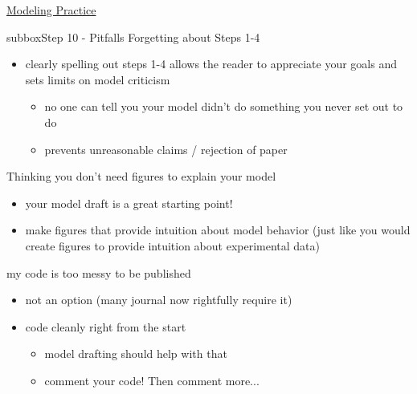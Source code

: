 \begin{textbox}{\href{https://compneuro.neuromatch.io/projects/modelingsteps/ModelingSteps_5through10.html}{Modeling Practice  } }
\begin{subbox}{subbox}{Step 10 - Pitfalls }
Forgetting about Steps 1-4
\begin{itemize}
    \item clearly spelling out steps 1-4 allows the reader to appreciate your goals and sets limits on model criticism
    \begin{itemize}
    \item no one can tell you your model didn't do something you never set out to do
       \item prevents unreasonable claims / rejection of paper \end{itemize}
\end{itemize}

Thinking you don't need figures to explain your model
\begin{itemize}
    \item  your model draft is a great starting point!  \item make figures that provide intuition about model behavior (just like you would create figures to provide intuition about experimental data) \end{itemize}

my code is too messy to be published
\begin{itemize}
    \item not an option (many journal now rightfully require it)
     \item  code cleanly right from the start
    \begin{itemize}
    \item model drafting should help with that
      \item  comment your code! Then comment more...
  \end{itemize}
\end{itemize}

\end{subbox}
 
 
\end{textbox}
